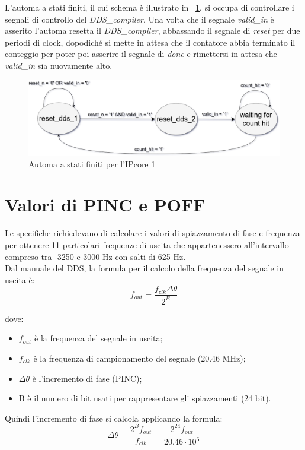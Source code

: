 \documentclass[12pt,a4paper,twoside,openany]{book}
\begin{document}
\clearpage
L'automa a stati finiti, il cui schema è illustrato in \figurename~\ref{ipcore1_fsm}, si occupa di controllare i segnali di controllo del \textit{DDS\_compiler}. Una volta che il segnale \textit{valid\_in} è asserito l'automa resetta il \textit{DDS\_compiler}, abbassando il segnale di \textit{reset} per due periodi di clock, dopodiché si mette in attesa che il contatore abbia terminato il conteggio per poter poi asserire il segnale di \textit{done} e rimettersi in attesa che \textit{valid\_in} sia nuovamente alto.

\begin{figure}
\begin{center}
\includegraphics[scale=0.38, keepaspectratio]{immagini/fsm_ipcore1}
\caption{Automa a stati finiti per l'IPcore 1}
\label{ipcore1_fsm}
\end{center}
\end{figure}

\section{Valori di PINC e POFF}
Le specifiche richiedevano di calcolare i valori di spiazzamento di fase e frequenza per ottenere 11 particolari frequenze di uscita che appartenessero all'intervallo compreso tra -3250 e 3000 Hz con salti di 625 Hz. \\
Dal manuale del DDS, la formula per il calcolo della frequenza del segnale in uscita è:
$$
	f_{out} = \frac{f_{clk} \Delta \theta}{2^{B}}
$$

dove:
\begin{itemize}
\item $f_{out}$ è la frequenza del segnale in uscita;
\item $f_{clk}$ è la frequenza di campionamento del segnale (20.46 MHz);
\item $\Delta \theta$ è l'incremento di fase (PINC);
\item B è il numero di bit usati per rappresentare gli spiazzamenti (24 bit).
\end{itemize}

Quindi l'incremento di fase si calcola applicando la formula:
$$
	\Delta \theta = \frac{2^B f_{out}}{f_{clk}} = \frac{2^{24} f_{out}}{20.46 \cdot 10^6}
$$
\end{document}
